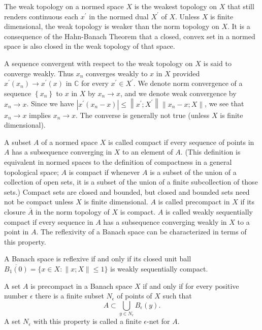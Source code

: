 \begin{para}
  The weak topology on a normed space $X$ is the weakest topology on $X$ that still renders continuous each $x^{\prime}$ in the normed dual $X^{\prime}$ of $X$. Unless $X$ is finite dimensional, the weak topology is weaker than the norm topology on $X$. It is a consequence of the Hahn-Banach Theorem that a closed, convex set in a normed space is also closed in the weak topology of that space.

  A sequence convergent with respect to the weak topology on $X$ is said to converge weakly. Thus $x_n$ converges weakly to $x$ in $X$ provided $x^{\prime}\left(x_n\right) \rightarrow x^{\prime}(x)$ in $\mathbb{C}$ for every $x^{\prime} \in X^{\prime}$. We denote norm convergence of a sequence $\left\{x_n\right\}$ to $x$ in $X$ by $x_n \rightarrow x$, and we denote weak convergence by $x_n \rightarrow x$. Since we have $\left|x^{\prime}\left(x_n-x\right)\right| \leq\left\|x^{\prime} ; X^{\prime}\right\|\left\|x_n-x ; X\right\|$, we see that $x_n \rightarrow x$ implies $x_n \rightarrow x$. The converse is generally not true (unless $X$ is finite dimensional).
\end{para}


\begin{para}
  A subset $A$ of a normed space $X$ is called compact if every sequence of points in $A$ has a subsequence converging in $X$ to an element of $A$. (This definition is equivalent in normed spaces to the definition of compactness in a general topological space; $A$ is compact if whenever $A$ is a subset of the union of a collection of open sets, it is a subset of the union of a finite subcollection of those sets.) Compact sets are closed and bounded, but closed and bounded sets need not be compact unless $X$ is finite dimensional. $A$ is called precompact in $X$ if its closure $\bar{A}$ in the norm topology of $X$ is compact. $A$ is called weakly sequentially compact if every sequence in $A$ has a subsequence converging weakly in $X$ to a point in $A$. The reflexivity of a Banach space can be characterized in terms of this property.
\end{para}


\begin{theorem}
  A Banach space is reflexive if and only if its closed unit ball $\overline{B_1(0)}=\{x \in X:\|x ; X\| \leq 1\}$ is weakly sequentially compact.
\end{theorem}


\begin{theorem}
  A set $A$ is precompact in a Banach space $X$ if and only if for every positive 
  number $\epsilon$ there is a finite subset $N_\epsilon$ of points of $X$ such that
  \[
  A \subset \bigcup_{y \in N_\epsilon} B_\epsilon(y) .
  \]
  A set $N_\epsilon$ with this property is called a finite $\epsilon$-net for $A$.
\end{theorem}


